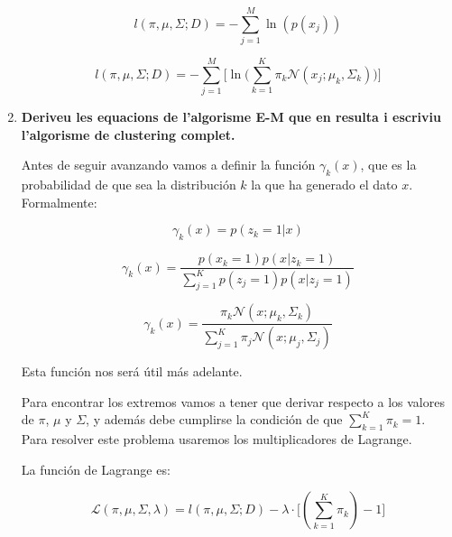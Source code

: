 \documentclass[a5paper]{article}
\begin{document}
\begin{enumerate}
\begin{equation*}
l(\pi, \mu, \Sigma; D) = -\sum_{j = 1}^{M} \ln(p(x_j)) 
\end{equation*}

\begin{equation*}
l(\pi, \mu, \Sigma; D) = -\sum_{j = 1}^{M} \Bigg[ 
\ln\Big(
\sum_{k = 1}^{K} \pi_k \mathcal{N}(x_j; \mu_k, \Sigma_k)
\Big)
\Bigg] 
\end{equation*}



\item \textbf{Deriveu les equacions de l'algorisme E-M que en resulta i escriviu l'algorisme de clustering complet.
}

Antes de seguir avanzando vamos a definir la función $\gamma_k(x)$, que es la probabilidad de que sea la distribución $k$ la que ha generado el dato $x$. Formalmente:

\begin{equation*}
\gamma_k(x) = p(z_k = 1 | x)
\end{equation*}

\begin{equation*}
\gamma_k(x) =
\frac
{p(x_k = 1)p(x | z_k = 1)}
{\sum_{j = 1}^{K} p(z_j = 1)p(x | z_j = 1)}
\end{equation*}

\begin{equation*}
\gamma_k(x) =
\frac
{\pi_k \mathcal{N}(x; \mu_k, \Sigma_k)}
{\sum_{j = 1}^{K}
    \pi_j \mathcal{N}(x; \mu_j, \Sigma_j)
}
\end{equation*}

Esta función nos será útil más adelante.

Para encontrar los extremos vamos a tener que derivar respecto a los valores de $\pi$, $\mu$ y $\Sigma$, y además debe cumplirse la condición de que $\sum_{k = 1}^{K} \pi_k = 1$. Para resolver este problema usaremos los multiplicadores de Lagrange.

La función de Lagrange es:

\begin{equation*}
\mathcal{L}(\pi, \mu, \Sigma, \lambda) = l(\pi, \mu, \Sigma; D) - \lambda \cdot \Big[(\sum_{k = 1}^{K} \pi_k) - 1\Big]
\end{equation*}


\end{enumerate}
\end{document}
